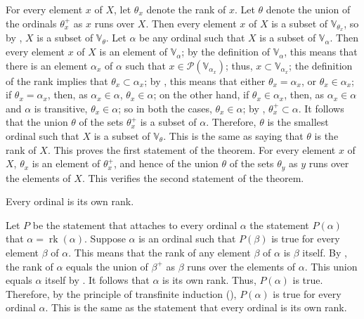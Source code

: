 \documentclass{article}
\begin{document}
For every element \(x\) of \(X\), let \(\theta_x\) denote the rank of
\(x\).  Let \(\theta\) denote the union of the ordinals \(\theta_x^+\)
as \(x\) runs over \(X\).  Then every element \(x\) of \(X\) is a
subset of \(\mathbb{V}_{\theta_x}\), so by , \(X\)
is a subset of \(\mathbb{V}_\theta\).  Let \(\alpha\) be any ordinal
such that \(X\) is a subset of \(\mathbb{V}_\alpha\).  Then every
element \(x\) of \(X\) is an element of \(\mathbb{V}_\alpha\); by the
definition of \(\mathbb{V}_\alpha\), this means that there is an
element \(\alpha_x\) of \(\alpha\) such that
\(x \in \mathcal{P}(\mathbb{V}_{\alpha_x})\); thus,
\(x \subset \mathbb{V}_{\alpha_x}\); the definition of the rank
implies that \(\theta_x \subset \alpha_x\); by ,
this means that either \(\theta_x = \alpha_x\), or
\(\theta_x \in \alpha_x\); if \(\theta_x = \alpha_x\), then, as
\(\alpha_x \in \alpha\), \(\theta_x \in \alpha\); on the other hand,
if \(\theta_x \in \alpha_x\), then, as \(\alpha_x \in \alpha\) and
\(\alpha\) is transitive, \(\theta_x \in \alpha\); so in both the
cases, \(\theta_x \in \alpha\); by ,
\(\theta_x^+ \subset \alpha\).  It follows that the union \(\theta\)
of the sets \(\theta_x^+\) is a subset of \(\alpha\).  Therefore,
\(\theta\) is the smallest ordinal such that \(X\) is a subset of
\(\mathbb{V}_\theta\).  This is the same as saying that \(\theta\) is
the rank of \(X\).  This proves the first statement of the theorem.
For every element \(x\) of \(X\), \(\theta_x\) is an element of
\(\theta_x^+\), and hence of the union \(\theta\) of the sets
\(\theta_y\) as \(y\) runs over the elements of \(X\).  This verifies
the second statement of the theorem.

\begin{theorem}
  \label{thm:dqbi8lx3}
  Every ordinal is its own rank.
\end{theorem}

Let \(P\) be the statement that attaches to every ordinal \(\alpha\)
the statement \(P(\alpha)\) that
\(\alpha = \operatorname{rk}(\alpha)\).  Suppose \(\alpha\) is an
ordinal such that \(P(\beta)\) is true for every element \(\beta\) of
\(\alpha\).  This means that the rank of any element \(\beta\) of
\(\alpha\) is \(\beta\) itself.  By , the rank of
\(\alpha\) equals the union of \(\beta^+\) as \(\beta\) runs over the
elements of \(\alpha\).  This union equals \(\alpha\) itself by
.  It follows that \(\alpha\) is its own rank.
Thus, \(P(\alpha)\) is true.  Therefore, by the principle of
transfinite induction (), \(P(\alpha)\) is true for
every ordinal \(\alpha\).  This is the same as the statement that
every ordinal is its own rank.
\end{document}
